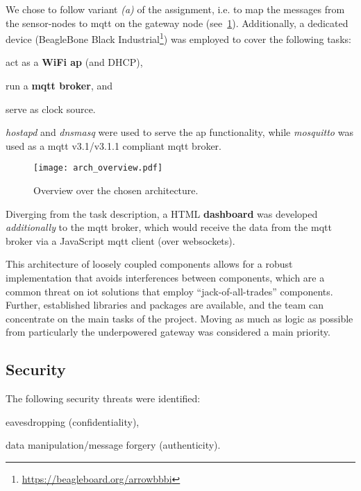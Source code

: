 We chose to follow variant \textit{(a)} of the assignment, i.e. to map the messages from the sensor-nodes to \gls{mqtt} on the gateway node (see~\cref{fig:arch_overview}). Additionally, a dedicated device (BeagleBone Black Industrial\footnote{\url{https://beagleboard.org/arrowbbbi}}) was employed to cover the following tasks:
\begin{enumerate*}[label=(\alph*)]
  \item act as a \textbf{WiFi \gls{ap}} (and DHCP),
  \item run a \textbf{\gls{mqtt} broker}, and
  \item serve as clock source.
\end{enumerate*}
\textit{hostapd} and \textit{dnsmasq} were used to serve the \gls{ap} functionality, while \textit{mosquitto} was used as a \gls{mqtt} v3.1/v3.1.1 compliant \gls{mqtt} broker.

\begin{figure}[htb]
  \centering
  \texttt{[image: arch\_overview.pdf]}
  \caption{Overview over the chosen architecture.}
  \label{fig:arch_overview}
\end{figure}

Diverging from the task description, a HTML \textbf{dashboard} was developed \emph{additionally} to the \gls{mqtt} broker, which would receive the data from the \gls{mqtt} broker via a JavaScript \gls{mqtt} client (over websockets).

This architecture of loosely coupled components allows for a robust implementation that avoids interferences between components, which are a common threat on \gls{iot} solutions that employ ``jack-of-all-trades'' components. Further, established libraries and packages are available, and the team can concentrate on the main tasks of the project. Moving as much as logic as possible from particularly the underpowered gateway was considered a main priority.


\subsection{Security}
\label{sec:security}

The following security threats were identified:

\begin{compactitem}
  \item eavesdropping (confidentiality),
  \item data manipulation/message forgery (authenticity).
\end{compactitem}

